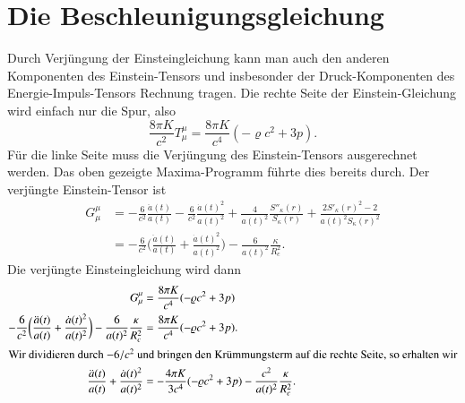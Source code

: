 \section{Die Beschleunigungsgleichung}
Durch Verjüngung der Einsteingleichung kann man auch den anderen
Komponenten des Einstein-Tensors und insbesonder der Druck-Komponenten 
des Energie-Impuls-Tensors Rechnung tragen.
Die rechte Seite der Einstein-Gleichung wird einfach nur die
Spur, also
\[
\frac{8\pi K}{c^2}
T^\mu_\mu = \frac{8\pi K}{c^4}(-\varrho c^2 + 3p).
\]
Für die linke Seite muss die Verjüngung des Einstein-Tensors ausgerechnet
werden.
Das oben gezeigte Maxima-Programm führte dies bereits durch.
Der verjüngte Einstein-Tensor ist
\begin{align*}
G^\mu_\mu
&=
- \frac{6}{c^2} \frac{\ddot a(t)}{a(t)}
-\frac{6}{c^2} \frac{\dot a(t)^2}{a(t)^2}
+\frac{4}{a(t)^2} \frac{S''_\kappa(r)}{S_\kappa(r)}
+\frac{2S'_\kappa(r)^2-2}{a(t)^2 S_\kappa(r)^2}
\\
&=
-\frac{6}{c^2}\biggl(\frac{\ddot a(t)}{a(t)} + \frac{\dot a(t)^2}{a(t)^2}\biggr)
-\frac{6}{a(t)^2}\frac{\kappa }{R_c^2}.
\end{align*}
Die verjüngte Einsteingleichung wird dann
\begin{align*}
G^\mu_\mu
&=
\frac{8\pi K}{c^4}(-\varrho  c^2+ 3p)
\\
-\frac{6}{c^2}\biggl(\frac{\ddot a(t)}{a(t)} + \frac{\dot a(t)^2}{a(t)^2}\biggr)
-\frac{6}{a(t)^2}\frac{\kappa }{R_c^2}
&=
\frac{8\pi K}{c^4}(-\varrho c^2 + 3p).
\\
\intertext{Wir dividieren durch $-6/c^2$ und bringen den Krümmungsterm
auf die rechte Seite, so erhalten wir}
\frac{\ddot a(t)}{a(t)} + \frac{\dot a(t)^2}{a(t)^2}
&=
-\frac{4\pi K}{3c^4}(-\varrho c^2 + 3p)
-\frac{c^2}{a(t)^2}\frac{\kappa }{R_c^2}.
\end{align*}
